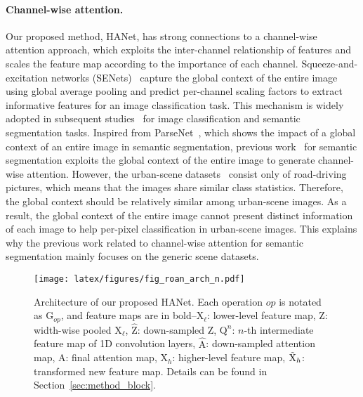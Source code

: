\documentclass[10pt,twocolumn,letterpaper]{article}
\begin{document}
\paragraph{Channel-wise attention.}
\vspace*{-0.5cm}
Our proposed method, HANet, has strong connections to a channel-wise attention approach, which exploits the inter-channel relationship of features and scales the feature map according to the importance of each channel. Squeeze-and-excitation networks (SENets)~\cite{hu2018squeeze} capture 
the global context of the entire image using global average pooling and predict per-channel scaling factors to extract informative features for an image classification task. This mechanism is widely adopted in subsequent studies~\cite{woo2018cbam,zhang2018context,yu2018learning,li2018pyramid} for image classification and semantic segmentation tasks. Inspired from ParseNet~\cite{liu2015parsenet}, which shows the impact of a global context of an entire image
in semantic segmentation, previous work~\cite{zhang2018context,yu2018learning,li2018pyramid} for semantic segmentation exploits the global context of the entire image to generate channel-wise attention. However, the urban-scene datasets~\cite{cordts2016cityscapes,Alhaija2018IJCV,neuhold2017mapillary,BrostowSFC:ECCV08} consist only of road-driving pictures, which means that the images share similar class statistics. Therefore, the global context should be relatively similar among urban-scene images. As a result, the global context of the entire image cannot present distinct information of each image to help per-pixel classification in urban-scene images. This explains why the previous work related to channel-wise attention for semantic segmentation mainly focuses on the generic scene datasets.



\begin{figure*}[ht!]
\vspace*{-0.2cm}
  \centering\texttt{[image: latex/figures/fig\_roan\_arch\_n.pdf]}
\vspace*{-0.3cm}
  \caption{Architecture of our proposed HANet. 
Each operation $op$ is notated as $\text{G}_{op}$, and feature maps are in bold--$\text{X}_{\ell}$: lower-level feature map, Z: width-wise pooled $\text{X}_{\ell}$, $\hat{\text{Z}}$: down-sampled Z, $\text{Q}^{n}$: $n$-th intermediate feature map of 1D convolution layers, $\hat{\text{A}}$: down-sampled attention map, A: final attention map, $\text{X}_{h}$: higher-level feature map, $\Tilde{\text{X}}_{h}$: transformed new feature map. Details can be found in Section~\ref{sec:method_block}.}
\label{fig:roab_arch}
\vspace*{-0.5cm}
\end{figure*}
\end{document}
